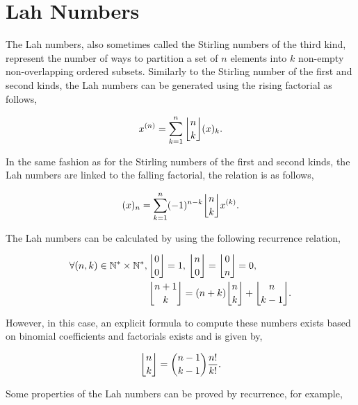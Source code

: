 \section{Lah Numbers}

The Lah numbers, also sometimes called the Stirling numbers of the third kind, represent the number of ways to partition a set of $n$ elements into $k$ non-empty non-overlapping ordered subsets. Similarly to the Stirling number of the first and second kinds, the Lah numbers can be generated using the rising factorial as follows,

\begin{equation} \label{eqnA.9}
x^{(n)} = \sum_{k=1}^{n} \genfrac{\lfloor}{\rfloor}{0pt}{0}{n}{k} (x)_{k}.
\end{equation}

In the same fashion as for the Stirling numbers of the first and second kinds, the Lah numbers are linked to the falling factorial, the relation is as follows,

\begin{equation} \label{eqnA.10}
(x)_{n} = \sum_{k=1}^{n} (-1)^{n-k} \genfrac{\lfloor}{\rfloor}{0pt}{0}{n}{k} x^{(k)}.
\end{equation}

The Lah numbers can be calculated by using the following recurrence relation,

\begin{subequations} \label{eqnA.11}
\begin{align}
\forall (n,k) \in \mathbb{N}^{*} \times \mathbb{N}^{*} ,\, & \genfrac{\lfloor}{\rfloor}{0pt}{0}{0}{0} = 1 ,\, \genfrac{\lfloor}{\rfloor}{0pt}{0}{n}{0} = \genfrac{\lfloor}{\rfloor}{0pt}{0}{0}{n} = 0, \label{eqnA.11a} \\
& \genfrac{\lfloor}{\rfloor}{0pt}{0}{n+1}{k} = (n+k)\genfrac{\lfloor}{\rfloor}{0pt}{0}{n}{k} + \genfrac{\lfloor}{\rfloor}{0pt}{0}{n}{k-1}. \label{eqnA.11b}
\end{align}
\end{subequations}

However, in this case, an explicit formula to compute these numbers exists based on binomial coefficients and factorials exists and is given by,

\begin{equation} \label{eqnA.12}
\genfrac{\lfloor}{\rfloor}{0pt}{0}{n}{k} = \genfrac{(}{)}{0pt}{0}{n-1}{k-1} \frac{n!}{k!}.
\end{equation}

Some properties of the Lah numbers can be proved by recurrence, for example,


